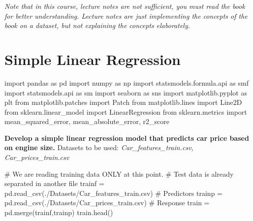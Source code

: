 \documentclass[
  letterpaper,
  DIV=11,
  numbers=noendperiod]{scrreprt}
\newenvironment{Shaded}{\begin{snugshade}}{\end{snugshade}}
\newcommand{\CommentTok}[1]{\textcolor[rgb]{0.37,0.37,0.37}{#1}}
\newcommand{\ImportTok}[1]{\textcolor[rgb]{0.00,0.46,0.62}{#1}}
\newcommand{\NormalTok}[1]{\textcolor[rgb]{0.00,0.23,0.31}{#1}}
\newcommand{\OperatorTok}[1]{\textcolor[rgb]{0.37,0.37,0.37}{#1}}
\newcommand{\StringTok}[1]{\textcolor[rgb]{0.13,0.47,0.30}{#1}}
\begin{document}
\emph{Note that in this course, lecture notes are not sufficient, you
must read the book for better understanding. Lecture notes are just
implementing the concepts of the book on a dataset, but not explaining
the concepts elaborately.}

\section{Simple Linear Regression}\label{simple-linear-regression-1}

\begin{Shaded}
\begin{Highlighting}[]
\ImportTok{import}\NormalTok{ pandas }\ImportTok{as}\NormalTok{ pd}
\ImportTok{import}\NormalTok{ numpy }\ImportTok{as}\NormalTok{ np}
\ImportTok{import}\NormalTok{ statsmodels.formula.api }\ImportTok{as}\NormalTok{ smf}
\ImportTok{import}\NormalTok{ statsmodels.api }\ImportTok{as}\NormalTok{ sm}
\ImportTok{import}\NormalTok{ seaborn }\ImportTok{as}\NormalTok{ sns}
\ImportTok{import}\NormalTok{ matplotlib.pyplot }\ImportTok{as}\NormalTok{ plt}
\ImportTok{from}\NormalTok{ matplotlib.patches }\ImportTok{import}\NormalTok{ Patch}
\ImportTok{from}\NormalTok{ matplotlib.lines }\ImportTok{import}\NormalTok{ Line2D}
\ImportTok{from}\NormalTok{ sklearn.linear\_model }\ImportTok{import}\NormalTok{ LinearRegression}
\ImportTok{from}\NormalTok{ sklearn.metrics }\ImportTok{import}\NormalTok{ mean\_squared\_error, mean\_absolute\_error, r2\_score}
\end{Highlighting}
\end{Shaded}

\textbf{Develop a simple linear regression model that predicts car price
based on engine size.} Datasets to be used:
\emph{Car\_features\_train.csv, Car\_prices\_train.csv}

\begin{Shaded}
\begin{Highlighting}[]
\CommentTok{\# We are reading training data ONLY at this point.}
\CommentTok{\# Test data is already separated in another file}
\NormalTok{trainf }\OperatorTok{=}\NormalTok{ pd.read\_csv(}\StringTok{\textquotesingle{}./Datasets/Car\_features\_train.csv\textquotesingle{}}\NormalTok{) }\CommentTok{\# Predictors}
\NormalTok{trainp }\OperatorTok{=}\NormalTok{ pd.read\_csv(}\StringTok{\textquotesingle{}./Datasets/Car\_prices\_train.csv\textquotesingle{}}\NormalTok{) }\CommentTok{\# Response}
\NormalTok{train }\OperatorTok{=}\NormalTok{ pd.merge(trainf,trainp)}
\NormalTok{train.head()}
\end{Highlighting}
\end{Shaded}
\end{document}
